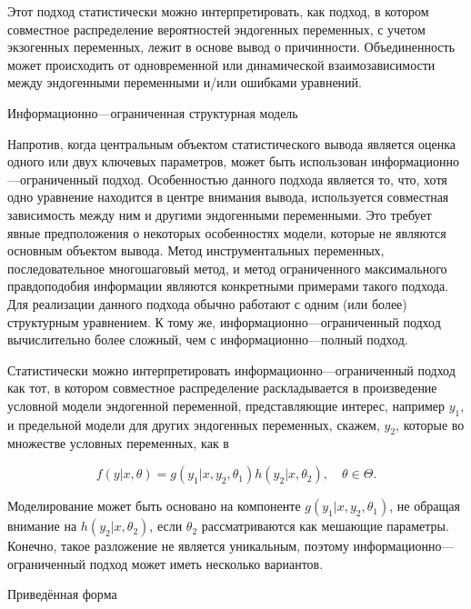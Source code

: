 	Этот подход статистически можно интерпретировать, как подход, в котором совместное распределение вероятностей эндогенных переменных, с учетом экзогенных переменных, лежит в основе вывод о причинности. Объединенность может происходить от одновременной или динамической взаимозависимости между эндогенными переменными и/или ошибками уравнений.
	
	
\begin{center}
Информационно---ограниченная структурная модель
\end{center}


Напротив, когда центральным объектом статистического вывода является оценка одного или двух ключевых параметров, может быть использован информационно---ограниченный подход. Особенностью данного подхода является то, что, хотя одно уравнение находится в центре внимания вывода, используется совместная зависимость между ним и другими эндогенными переменными. Это требует явные предположения о некоторых особенностях модели, которые не являются основным объектом вывода. Метод инструментальных переменных, последовательное многошаговый метод, и метод ограниченного максимального правдоподобия информации являются конкретными примерами такого подхода. Для реализации данного подхода обычно работают с одним (или более) структурным уравнением. К тому же, информационно---ограниченный  подход вычислительно более сложный, чем с информационно---полный подход.


	Статистически можно интерпретировать информационно---ограниченный подход как тот, в котором совместное распределение раскладывается в произведение условной модели эндогенной переменной, представляющие интерес, например $y_{1}$, и предельной модели для других эндогенных переменных, скажем, $y_{2}$, которые во множестве условных переменных, как в

\begin{equation}
f(y|x,\theta)=g(y_{1}|x,y_{2},\theta_{1})h(y_{2}|x,\theta_{2}), \quad \theta \in \Theta.
\end{equation}


Моделирование может быть основано на компоненте $g(y_{1}|x,y_{2},\theta_{1})$, не обращая внимание на $h(y_{2}|x,\theta_{2})$, если $\theta_{2}$ рассматриваются как мешающие параметры. Конечно, такое разложение не является уникальным, поэтому информационно---ограниченный подход может иметь несколько вариантов.


\begin{center}
Приведённая форма
\end{center}


